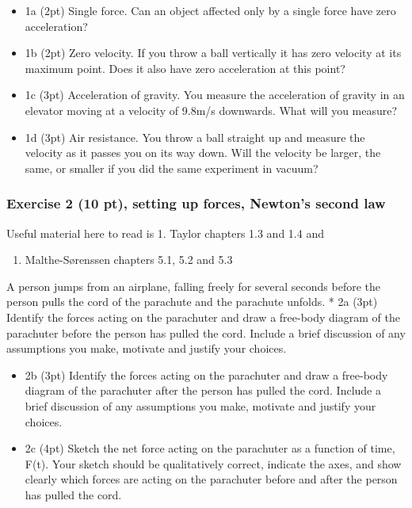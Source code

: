 \documentclass[11pt]{article}
\providecommand{\tightlist}{%
      \setlength{\itemsep}{0pt}\setlength{\parskip}{0pt}}
\begin{document}
\begin{itemize}
\item
  1a (2pt) Single force. Can an object affected only by a single force
  have zero acceleration?
\item
  1b (2pt) Zero velocity. If you throw a ball vertically it has zero
  velocity at its maximum point. Does it also have zero acceleration at
  this point?
\item
  1c (3pt) Acceleration of gravity. You measure the acceleration of
  gravity in an elevator moving at a velocity of 9.8m/s downwards. What
  will you measure?
\item
  1d (3pt) Air resistance. You throw a ball straight up and measure the
  velocity as it passes you on its way down. Will the velocity be
  larger, the same, or smaller if you did the same experiment in vacuum?
\end{itemize}

    \subsubsection{Exercise 2 (10 pt), setting up forces, Newton's second
law}\label{exercise-2-10-pt-setting-up-forces-newtons-second-law}

Useful material here to read is 1. Taylor chapters 1.3 and 1.4 and

\begin{enumerate}
\def\labelenumi{\arabic{enumi}.}
\setcounter{enumi}{1}
\tightlist
\item
  Malthe-Sørenssen chapters 5.1, 5.2 and 5.3
\end{enumerate}

A person jumps from an airplane, falling freely for several seconds
before the person pulls the cord of the parachute and the parachute
unfolds. * 2a (3pt) Identify the forces acting on the parachuter and
draw a free-body diagram of the parachuter before the person has pulled
the cord. Include a brief discussion of any assumptions you make,
motivate and justify your choices.

\begin{itemize}
\item
  2b (3pt) Identify the forces acting on the parachuter and draw a
  free-body diagram of the parachuter after the person has pulled the
  cord. Include a brief discussion of any assumptions you make, motivate
  and justify your choices.
\item
  2c (4pt) Sketch the net force acting on the parachuter as a function
  of time, F(t). Your sketch should be qualitatively correct, indicate
  the axes, and show clearly which forces are acting on the parachuter
  before and after the person has pulled the cord.
\end{itemize}
\end{document}
